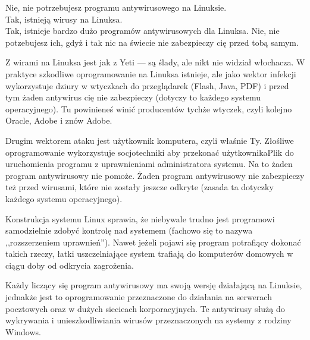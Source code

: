 \noindent Nie, nie potrzebujesz programu antywirusowego na Linuksie.\\
Tak, istnieją wirusy na Linuksa.\\
Tak, istnieje bardzo dużo programów antywirusowych dla Linuksa.
Nie, nie potzebujesz ich, gdyż i tak nic na świecie nie zabezpieczy cię przed tobą samym.

Z wirami na Linuksa jest jak z Yeti --- są ślady, ale nikt nie widział włochacza. W praktyce szkodliwe oprogramowanie na Linuksa istnieje, ale jako wektor infekcji wykorzystuje dziury w wtyczkach do przeglądarek (Flash, Java, PDF) i przed tym żaden antywirus cię nie zabezpieczy (dotyczy to każdego systemu operacyjnego). Tu powinieneś winić producentów tychże wtyczek, czyli kolejno Oracle, Adobe i znów Adobe.

Drugim wektorem ataku jest użytkownik komputera, czyli właśnie Ty. Złośliwe oprogramowanie wykorzystuje socjotechniki aby przekonać użytkownikaPlik do uruchomienia programu z uprawnieniami administratora systemu. Na to żaden program antywirusowy nie pomoże. Żaden program antywirusowy nie zabezpieczy też przed wirusami, które nie zostały jeszcze odkryte (zasada ta dotyczky każdego systemu operacyjnego).

Konstrukcja systemu Linux sprawia, że niebywale trudno jest programowi samodzielnie zdobyć kontrolę nad systemem (fachowo się to nazywa ,,rozszerzeniem uprawnień''). Nawet jeżeli pojawi się program potrafiący dokonać takich rzeczy, łatki uszczelniające system trafiają do komputerów domowych w ciągu doby od odkrycia zagrożenia.

Każdy liczący się program antywirusowy ma swoją wersję działającą na Linuksie, jednakże jest to oprogramowanie przeznaczone do działania na serwerach pocztowych oraz w dużych siecieach korporacyjnych. Te antywirusy służą do wykrywania i unieszkodliwiania wirusów przeznaczonych na systemy z rodziny Windows.

